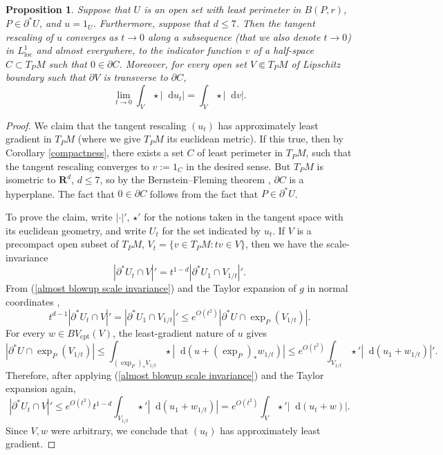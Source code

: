 \documentclass[reqno,10pt]{amsart}
\newcommand{\RR}{\mathbf{R}}
\newcommand*\dif{\mathop{}\!\mathrm{d}}
\newcommand{\loc}{\mathrm{loc}}
\newcommand{\cpt}{\mathrm{cpt}}
\newtheorem{proposition}[theorem]{Proposition}
\theoremstyle{definition}
\numberwithin{equation}{section}
\begin{document}
\begin{proposition}\label{blowup theorem}
Suppose that $U$ is an open set with least perimeter in $B(P, r)$, $P \in \partial^* U$, and $u = 1_U$.
Furthermore, suppose that $d \leq 7$.
Then the tangent rescaling of $u$ converges as $t \to 0$ along a subsequence (that we also denote $t \to 0$) in $L^1_\loc$ and almost everywhere, to the indicator function $v$ of a half-space $C \subset T_PM$ such that $0 \in \partial C$.
Moreover, for every open set $V \Subset T_PM$ of Lipschitz boundary such that $\partial V$ is transverse to $\partial C$,
$$\lim_{t \to 0} \int_V \star |\dif u_t| = \int_V \star |\dif v|.$$
\end{proposition}
\begin{proof}
We claim that the tangent rescaling $(u_t)$ has approximately least gradient in $T_PM$ (where we give $T_PM$ its euclidean metric). If this true, then by Corollary \ref{compactness}, there exists a set $C$ of least perimeter in $T_PM$, such that the tangent rescaling converges to $v := 1_C$ in the desired sense.
But $T_PM$ is isometric to $\RR^d$, $d \leq 7$, so by the Bernstein--Fleming theorem \cite[Theorem 17.3]{Giusti77}, $\partial C$ is a hyperplane.
The fact that $0 \in \partial C$ follows from the fact that $P \in \partial^* U$.

To prove the claim, write $|\cdot|'$, $\star'$ for the notions taken in the tangent space with its euclidean geometry, and write $U_t$ for the set indicated by $u_t$.
If $V$ is a precompact open subset of $T_PM$, $V_t = \{v \in T_PM: tv \in V\}$, then we have the scale-invariance
\begin{equation}\label{almost blowup scale invariance}
|\partial^* U_t \cap V|' = t^{1 - d}|\partial^* U_1 \cap V_{1/t}|'.
\end{equation}
From (\ref{almost blowup scale invariance}) and the Taylor expansion of $g$ in normal coordinates \cite[Lemma 3.4]{schoen1994lectures},
$$t^{d - 1} |\partial^* U_t \cap V|' = |\partial^* U_1 \cap V_{1/t}|' \leq e^{O(t^2)} |\partial^* U \cap \exp_P(V_{1/t})|.$$
For every $w \in BV_\cpt(V)$, the least-gradient nature of $u$ gives
$$|\partial^* U \cap \exp_P(V_{1/t})| \leq \int_{(\exp_P)_* V_{1/t}} \star |\dif(u + (\exp_P)_* w_{1/t})| \leq e^{O(t^2)} \int_{V_{1/t}} \star'|\dif(u_1 + w_{1/t})|'.$$
Therefore, after applying (\ref{almost blowup scale invariance}) and the Taylor expansion again,
$$|\partial^* U_t \cap V|' \leq e^{O(t^2)} t^{1 - d} \int_{V_{1/t}} \star' |\dif (u_1 + w_{1/t})| = e^{O(t^2)} \int_V \star' |\dif (u_t + w)|.$$
Since $V,w$ were arbitrary, we conclude that $(u_t)$ has approximately least gradient.
\end{proof}
\end{document}
